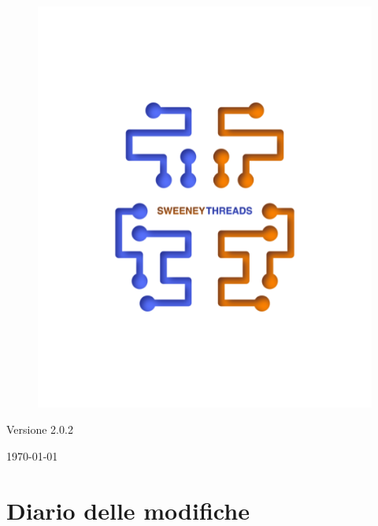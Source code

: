 \documentclass[a4paper]{article}
\begin{document}
\begin{titlepage}
		\begin{figure}[H]
			\centering
			\includegraphics[scale=0.8]{../sweeney.png}
		\end{figure}
		\begin{center}
			Versione 2.0.2
		\end{center}
		{\large \today}\\[3cm] 
		\vfill  
	\end{titlepage}
	
	\tableofcontents
	
	\newpage 
	\section*{Diario delle modifiche}
	
\end{document}
